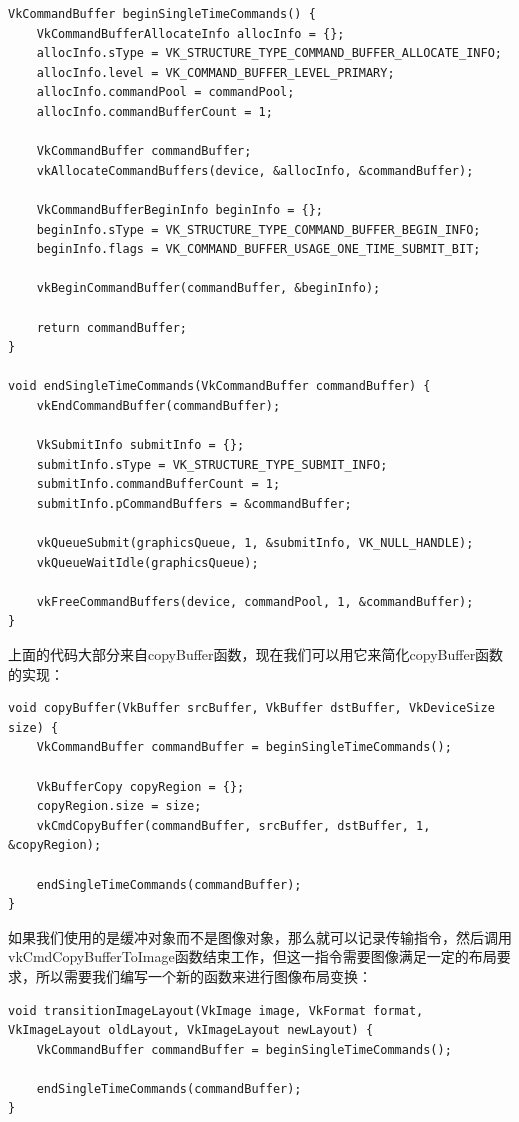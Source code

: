 \documentclass{ctexart}
\begin{document}
\begin{lstlisting}[language={[ANSI]C}]
VkCommandBuffer beginSingleTimeCommands() {
	VkCommandBufferAllocateInfo allocInfo = {};
	allocInfo.sType = VK_STRUCTURE_TYPE_COMMAND_BUFFER_ALLOCATE_INFO;
	allocInfo.level = VK_COMMAND_BUFFER_LEVEL_PRIMARY;
	allocInfo.commandPool = commandPool;
	allocInfo.commandBufferCount = 1;

	VkCommandBuffer commandBuffer;
	vkAllocateCommandBuffers(device, &allocInfo, &commandBuffer);

	VkCommandBufferBeginInfo beginInfo = {};
	beginInfo.sType = VK_STRUCTURE_TYPE_COMMAND_BUFFER_BEGIN_INFO;
	beginInfo.flags = VK_COMMAND_BUFFER_USAGE_ONE_TIME_SUBMIT_BIT;

	vkBeginCommandBuffer(commandBuffer, &beginInfo);

	return commandBuffer;
}

void endSingleTimeCommands(VkCommandBuffer commandBuffer) {
	vkEndCommandBuffer(commandBuffer);

	VkSubmitInfo submitInfo = {};
	submitInfo.sType = VK_STRUCTURE_TYPE_SUBMIT_INFO;
	submitInfo.commandBufferCount = 1;
	submitInfo.pCommandBuffers = &commandBuffer;

	vkQueueSubmit(graphicsQueue, 1, &submitInfo, VK_NULL_HANDLE);
	vkQueueWaitIdle(graphicsQueue);

	vkFreeCommandBuffers(device, commandPool, 1, &commandBuffer);
}
\end{lstlisting}

上面的代码大部分来自copyBuffer函数，现在我们可以用它来简化copyBuffer函数的实现：

\begin{lstlisting}[language={[ANSI]C}]
void copyBuffer(VkBuffer srcBuffer, VkBuffer dstBuffer, VkDeviceSize size) {
	VkCommandBuffer commandBuffer = beginSingleTimeCommands();

	VkBufferCopy copyRegion = {};
	copyRegion.size = size;
	vkCmdCopyBuffer(commandBuffer, srcBuffer, dstBuffer, 1, &copyRegion);

	endSingleTimeCommands(commandBuffer);
}
\end{lstlisting}

如果我们使用的是缓冲对象而不是图像对象，那么就可以记录传输指令，然后调用vkCmdCopyBufferToImage函数结束工作，但这一指令需要图像满足一定的布局要求，所以需要我们编写一个新的函数来进行图像布局变换：

\begin{lstlisting}[language={[ANSI]C}]
void transitionImageLayout(VkImage image, VkFormat format,
VkImageLayout oldLayout, VkImageLayout newLayout) {
	VkCommandBuffer commandBuffer = beginSingleTimeCommands();

	endSingleTimeCommands(commandBuffer);
}
\end{lstlisting}
\end{document}
